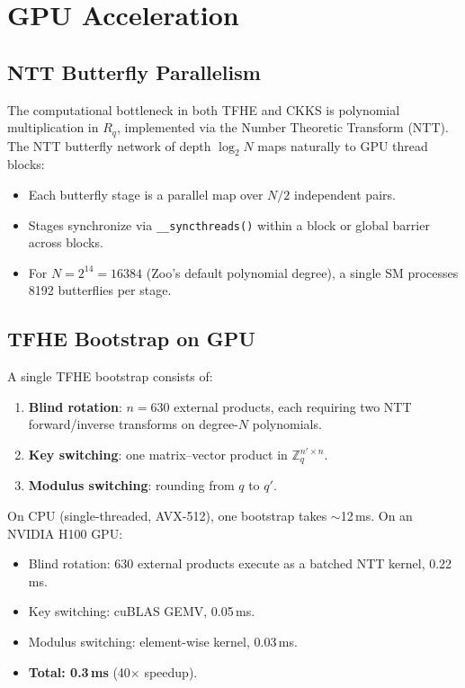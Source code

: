 \documentclass[11pt,letterpaper]{article}
\theoremstyle{definition}
\theoremstyle{remark}
\newcommand{\TFHE}{\textsc{TFHE}}
\newcommand{\CKKS}{\textsc{CKKS}}
\newcommand{\NTT}{\textsc{NTT}}
\begin{document}
\section{GPU Acceleration}
\label{sec:gpu}

\subsection{NTT Butterfly Parallelism}

The computational bottleneck in both \TFHE{} and \CKKS{} is polynomial multiplication in $R_q$, implemented via the Number Theoretic Transform (\NTT{}). The \NTT{} butterfly network of depth $\log_2 N$ maps naturally to GPU thread blocks:

\begin{itemize}
  \item Each butterfly stage is a parallel map over $N/2$ independent pairs.
  \item Stages synchronize via \texttt{\_\_syncthreads()} within a block or global barrier across blocks.
  \item For $N = 2^{14} = 16384$ (Zoo's default polynomial degree), a single SM processes 8192 butterflies per stage.
\end{itemize}

\subsection{TFHE Bootstrap on GPU}

A single \TFHE{} bootstrap consists of:

\begin{enumerate}
  \item \textbf{Blind rotation}: $n = 630$ external products, each requiring two \NTT{} forward/inverse transforms on degree-$N$ polynomials.
  \item \textbf{Key switching}: one matrix--vector product in $\mathbb{Z}_q^{n' \times n}$.
  \item \textbf{Modulus switching}: rounding from $q$ to $q'$.
\end{enumerate}

On CPU (single-threaded, AVX-512), one bootstrap takes $\sim$12\,ms. On an NVIDIA H100 GPU:

\begin{itemize}
  \item Blind rotation: 630 external products execute as a batched \NTT{} kernel, 0.22\,ms.
  \item Key switching: cuBLAS GEMV, 0.05\,ms.
  \item Modulus switching: element-wise kernel, 0.03\,ms.
  \item \textbf{Total: 0.3\,ms} (40$\times$ speedup).
\end{itemize}
\end{document}
